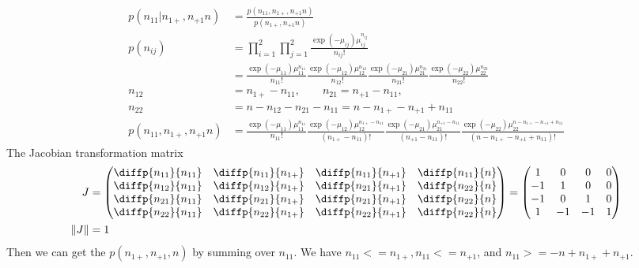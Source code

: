\begin{itemize}
\begin{align*}
	p(n_{11} | n_{1+}, n_{+1} n) &= \frac{p(n_{11}, n_{1+}, n_{+1} n)}{p(n_{1+}, n_{+1} n)}\\
		p(n_{ij}) &= \prod_{i=1}^2 \prod_{j=1}^2 \frac{\exp(-\mu_{ij}) \mu_{ij}^{n_{ij}}}{n_{ij}!} \\
		&= \frac{\exp(-\mu_{11})\mu_{11}^{n_{11}} }{n_{11}!} \frac{\exp(-\mu_{12})\mu_{12}^{n_{12}}}{n_{12}!} \frac{\exp(-\mu_{21})\mu_{21}^{n_{21}}}{n_{21}!} \frac{\exp(-\mu_{22})\mu_{22}^{n_{22}}}{n_{22}!}\\
		n_{12} &= n_{1+} - n_{11}, \qquad n_{21} = n_{+1} - n_{11}, \\ n_{22} &= n - n_{12} - n_{21} - n_{11} = n- n_{1+} - n_{+1} + n_{11}\\
		p(n_{11}, n_{1+}, n_{+1} n) &= \frac{\exp(-\mu_{11})\mu_{11}^{n_{11}} }{n_{11}!} \frac{\exp(-\mu_{12})\mu_{12}^{n_{1+} - n_{11}}}{(n_{1+} - n_{11})!} \frac{\exp(-\mu_{21})\mu_{21}^{n_{+1} - n_{11}}}{(n_{+1} - n_{11})!} \frac{\exp(-\mu_{22})\mu_{22}^{n- n_{1+} - n_{+1} + n_{11}}}{(n- n_{1+} - n_{+1} + n_{11})!}
\end{align*}	
The Jacobian transformation matrix 
\begin{align*}
	J &=  \begin{pmatrix}
	\diffp{{n_{11}}}{{n_{11}}} & \diffp{{n_{11}}}{{n_{1+}}} & \diffp{{n_{11}}}{{n_{+1}}} & \diffp{{n_{11}}}{{n}}\\
	\diffp{{n_{12}}}{{n_{11}}} & \diffp{{n_{12}}}{{n_{1+}}} & \diffp{{n_{21}}}{{n_{+1}}} & \diffp{{n_{22}}}{{n}}\\
	\diffp{{n_{21}}}{{n_{11}}} & \diffp{{n_{21}}}{{n_{1+}}} & \diffp{{n_{21}}}{{n_{+1}}} & \diffp{{n_{22}}}{{n}}\\
	\diffp{{n_{22}}}{{n_{11}}} & \diffp{{n_{22}}}{{n_{1+}}} & \diffp{{n_{22}}}{{n_{+1}}} & \diffp{{n_{22}}}{{n}} \\
\end{pmatrix}= \begin{pmatrix}
1 & 0 & 0 & 0\\
-1 & 1 & 0 & 0\\
-1 & 0 & 1 & 0\\
1 & -1 & -1 & 1\\
\end{pmatrix}\\
\lVert J \rVert &= 1
\end{align*}
Then we can get the $p(n_{1+}, n_{+1}, n)$ by summing over $n_{11}$. We have $n_{11} <= n_{1+}, n_{11} <= n_{+1}$, and $n_{11} >= -n + n_{1+} + n_{+1}$. 		
\begin{align*}

\end{align*}
\end{itemize}
